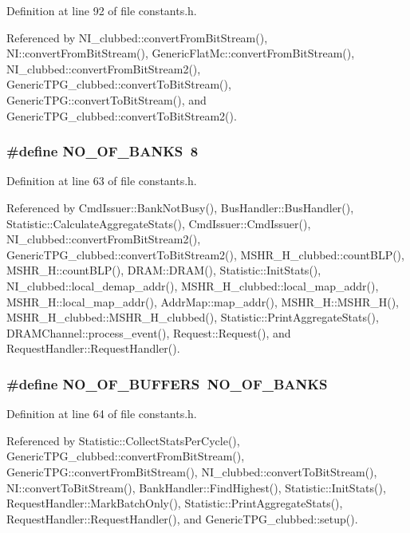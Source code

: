 Definition at line 92 of file constants.h.

Referenced by NI\_\-clubbed::convertFromBitStream(), NI::convertFromBitStream(), GenericFlatMc::convertFromBitStream(), NI\_\-clubbed::convertFromBitStream2(), GenericTPG\_\-clubbed::convertToBitStream(), GenericTPG::convertToBitStream(), and GenericTPG\_\-clubbed::convertToBitStream2().
\subsubsection[{NO\_\-OF\_\-BANKS}]{\setlength{\rightskip}{0pt plus 5cm}\#define NO\_\-OF\_\-BANKS~8}\label{constants_8h_9c2092fb2ee9f0a0776a00cc2cf0101f}




Definition at line 63 of file constants.h.

Referenced by CmdIssuer::BankNotBusy(), BusHandler::BusHandler(), Statistic::CalculateAggregateStats(), CmdIssuer::CmdIssuer(), NI\_\-clubbed::convertFromBitStream2(), GenericTPG\_\-clubbed::convertToBitStream2(), MSHR\_\-H\_\-clubbed::countBLP(), MSHR\_\-H::countBLP(), DRAM::DRAM(), Statistic::InitStats(), NI\_\-clubbed::local\_\-demap\_\-addr(), MSHR\_\-H\_\-clubbed::local\_\-map\_\-addr(), MSHR\_\-H::local\_\-map\_\-addr(), AddrMap::map\_\-addr(), MSHR\_\-H::MSHR\_\-H(), MSHR\_\-H\_\-clubbed::MSHR\_\-H\_\-clubbed(), Statistic::PrintAggregateStats(), DRAMChannel::process\_\-event(), Request::Request(), and RequestHandler::RequestHandler().
\subsubsection[{NO\_\-OF\_\-BUFFERS}]{\setlength{\rightskip}{0pt plus 5cm}\#define NO\_\-OF\_\-BUFFERS~NO\_\-OF\_\-BANKS}\label{constants_8h_a9f2d328954a62b047317e13f33bda12}




Definition at line 64 of file constants.h.

Referenced by Statistic::CollectStatsPerCycle(), GenericTPG\_\-clubbed::convertFromBitStream(), GenericTPG::convertFromBitStream(), NI\_\-clubbed::convertToBitStream(), NI::convertToBitStream(), BankHandler::FindHighest(), Statistic::InitStats(), RequestHandler::MarkBatchOnly(), Statistic::PrintAggregateStats(), RequestHandler::RequestHandler(), and GenericTPG\_\-clubbed::setup().
